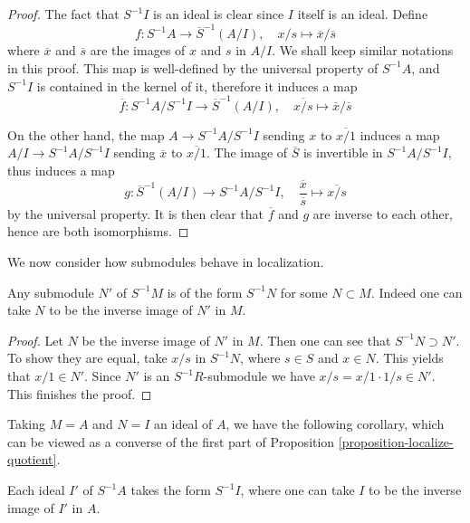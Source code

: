 \begin{proof}
The fact that $S^{-1}I$ is an ideal is clear since $I$ itself is an
ideal. Define
$$
f : S^{-1}A\longrightarrow \overline{S}^{-1}(A/I), \quad x/s\mapsto
\overline{x}/\overline{s}
$$
where $\overline{x}$ and $\overline{s}$ are the images of $x$ and
$s$ in $A/I$. We shall keep similar notations in this proof.
This map is well-defined by the universal property of
$S^{-1}A$, and $S^{-1}I$ is contained in the kernel of it,
therefore it induces a map
$$
\overline{f} : S^{-1}A/S^{-1}I \longrightarrow \overline{S}^{-1}(A/I), \quad
\overline{x/s}\mapsto \overline{x}/\overline{s}
$$

\medskip\noindent
On the other hand, the map $A\rightarrow S^{-1}A/S^{-1}I$ sending $x$ to
$\overline{x/1}$ induces a map $A/I \rightarrow S^{-1}A/S^{-1}I$ sending
$\overline{x}$ to $\overline{x/1}$. The image of $\overline{S}$ is
invertible in $S^{-1}A/S^{-1}I$, thus induces a map
$$
g : \overline{S}^{-1}(A/I) \longrightarrow S^{-1}A/S^{-1}I, \quad
\frac{\overline{x}}{\overline{s}}\mapsto \overline{x/s}
$$
by the universal property. It is then clear that $\overline{f}$ and $g$
are inverse to each other, hence are both isomorphisms.
\end{proof}

\noindent
We now consider how submodules behave in localization.

\begin{lemma}
\label{lemma-submodule-localization}
Any submodule $N'$ of $S^{-1}M$ is of the form $S^{-1}N$ for some
$N\subset M$. Indeed one can take $N$ to be the inverse image of
$N'$ in $M$.
\end{lemma}

\begin{proof}
Let $N$ be the inverse image of $N'$ in $M$. Then one can see that
$S^{-1}N\supset N'$. To show they are equal, take $x/s$ in
$S^{-1}N$, where $s\in S$ and $x\in N$. This yields that $x/1\in
N'$. Since $N'$ is an $S^{-1}R$-submodule we have
$x/s = x/1\cdot 1/s\in N'$. This finishes the proof.
\end{proof}

\noindent
Taking $M = A$ and $N = I$ an ideal of $A$, we have the following
corollary, which can be viewed as a converse of the first part of
Proposition \ref{proposition-localize-quotient}.

\begin{lemma}
\label{lemma-ideal-in-localization}
Each ideal $I'$ of $S^{-1}A$ takes the form $S^{-1}I$, where one can
take $I$ to be the inverse image of $I'$ in $A$.
\end{lemma}

